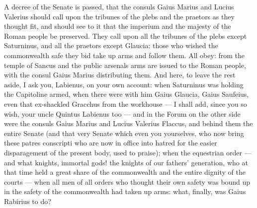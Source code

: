  A decree of the Senate is passed, that the consuls Gaius Marius and Lucius Valerius should call upon the tribunes of the plebs and the praetors as they thought fit, and should see to it that the imperium and the majesty of the Roman people be preserved. They call upon all the tribunes of the plebs except Saturninus, and all the praetors except Glaucia: those who wished the commonwealth safe they bid take up arms and follow them. All obey: from the temple of Sancus and the public arsenals arms are issued to the Roman people, with the consul Gaius Marius distributing them. And here, to leave the rest aside, I ask you, Labienus, on your own account: when Saturninus was holding the Capitoline armed, when there were with him Gaius Glaucia, Gaius Saufeius, even that ex-shackled Gracchus from the workhouse --- I shall add, since you so wish, your uncle Quintus Labienus too --- and in the Forum on the other side were the consuls Gaius Marius and Lucius Valerius Flaccus, and behind them the entire Senate (and that very Senate which even you yourselves, who now bring these patres conscripti who are now in office into hatred for the easier disparagement of the present body, used to praise); when the equestrian order --- and what knights, immortal gods! the knights of our fathers' generation, who at that time held a great share of the commonwealth and the entire dignity of the courts --- when all men of all orders who thought their own safety was bound up in the safety of the commonwealth had taken up arms: what, finally, was Gaius Rabirius to do?

